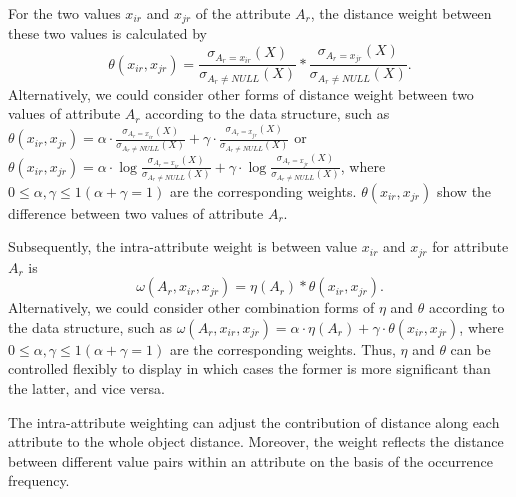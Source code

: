 \documentclass[review]{elsarticle}
\begin{document}
For the two values $x_{ir}$ and $x_{jr}$ of the attribute $A_r$, the distance weight between these two values is calculated by
\begin{equation}
\theta(x_{ir},x_{jr}) = \frac{\sigma_{A_r = x_{ir}}(X)}{\sigma_{A_r \neq NULL}(X)} * \frac{\sigma_{A_r = x_{jr}}(X)}{\sigma_{A_r \neq NULL}(X)}.
\label{equ8}
\end{equation}
Alternatively, we could consider other forms of distance weight between two values of attribute $A_r$ according to the data structure, such as $\theta(x_{ir},x_{jr}) = \alpha \cdot \frac{\sigma_{A_r = x_{ir}}(X)}{\sigma_{A_r \neq NULL}(X)} + \gamma \cdot \frac{\sigma_{A_r = x_{jr}}(X)}{\sigma_{A_r \neq NULL}(X)}$ or $\theta(x_{ir},x_{jr}) = \alpha \cdot \log{\frac{\sigma_{A_r = x_{ir}}(X)}{\sigma_{A_r \neq NULL}(X)}} + \gamma \cdot \log{\frac{\sigma_{A_r = x_{jr}}(X)}{\sigma_{A_r \neq NULL}(X)}}$, where $0 \leq \alpha,\gamma \leq 1 (\alpha+\gamma = 1)$ are the corresponding weights. $\theta(x_{ir},x_{jr})$ show the difference between two values of attribute $A_r$.

Subsequently, the intra-attribute weight is between value $x_{ir}$ and $x_{jr}$ for attribute $A_r$ is
\begin{equation}
\label{equ9}
\omega(A_r,x_{ir},x_{jr})= \eta(A_r) * \theta(x_{ir},x_{jr}).
\end{equation}
Alternatively, we could consider other combination forms of $\eta$ and $\theta$ according to the data structure, such as $\omega(A_r,x_{ir},x_{jr})= \alpha \cdot \eta(A_r) + \gamma \cdot \theta(x_{ir},x_{jr})$, where $0 \leq \alpha,\gamma \leq 1 (\alpha+\gamma = 1)$ are the corresponding weights. Thus, $\eta$ and $\theta$ can be controlled flexibly to display in which cases the former is more significant than the latter, and vice versa.

The intra-attribute weighting can adjust the contribution of distance along each attribute to the whole object distance. Moreover, the weight reflects the distance between different value pairs within an attribute on the basis of the occurrence frequency.
\end{document}
